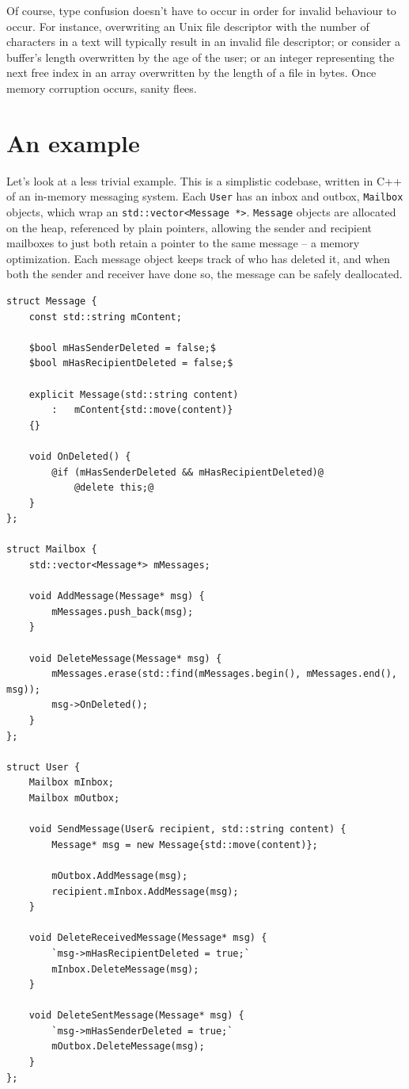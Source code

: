 Of course, type confusion doesn't have to occur in order for invalid behaviour to occur. For instance, overwriting an Unix file descriptor with the number of characters in a text will typically result in an invalid file descriptor; or consider a buffer's length overwritten by the age of the user; or an integer representing the next free index in an array overwritten by the length of a file in bytes. Once memory corruption occurs, sanity flees.

\section{An example}

Let's look at a less trivial example. This is a simplistic codebase, written in C++ of an in-memory messaging system. Each \lstinline!User! has an inbox and outbox, \lstinline!Mailbox! objects, which wrap an \lstinline!std::vector<Message *>!. \lstinline!Message! objects are allocated on the heap, referenced by plain pointers, allowing the sender and recipient mailboxes to just both retain a pointer to the same message -- a memory optimization. Each message object keeps track of who has deleted it, and when both the sender and receiver have done so, the message can be safely deallocated.

\begin{lstlisting}
struct Message {
	const std::string mContent;

	$bool mHasSenderDeleted = false;$
	$bool mHasRecipientDeleted = false;$

	explicit Message(std::string content)
		:   mContent{std::move(content)}
	{}

	void OnDeleted() {
		@if (mHasSenderDeleted && mHasRecipientDeleted)@
			@delete this;@
	}
};

struct Mailbox {
	std::vector<Message*> mMessages;

	void AddMessage(Message* msg) {
		mMessages.push_back(msg);
	}

	void DeleteMessage(Message* msg) {
		mMessages.erase(std::find(mMessages.begin(), mMessages.end(), msg));
		msg->OnDeleted();
	}
};

struct User {
	Mailbox mInbox;
	Mailbox mOutbox;

	void SendMessage(User& recipient, std::string content) {
		Message* msg = new Message{std::move(content)};

		mOutbox.AddMessage(msg);
		recipient.mInbox.AddMessage(msg);
	}

	void DeleteReceivedMessage(Message* msg) {
		`msg->mHasRecipientDeleted = true;`
		mInbox.DeleteMessage(msg);
	}

	void DeleteSentMessage(Message* msg) {
		`msg->mHasSenderDeleted = true;`
		mOutbox.DeleteMessage(msg);
	}
};
\end{lstlisting}

